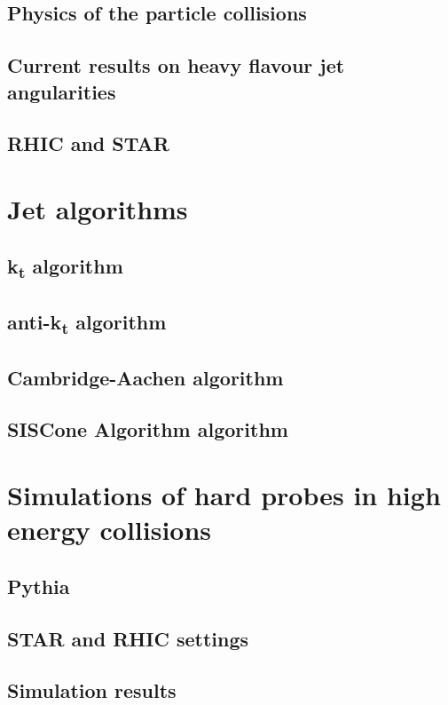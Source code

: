 \documentclass[a4paper,oneside,12pt]{book}
\begin{document}
    \section{Physics of the particle collisions}
    \section{Current results on heavy flavour jet angularities} %
    \section{RHIC and STAR}



    \chapter{Jet algorithms} %
    \section{k\textsubscript{t} algorithm}
    \section{anti-k\textsubscript{t} algorithm}
    \section{Cambridge-Aachen algorithm} %
    \section{SISCone Algorithm algorithm} %


    \chapter{Simulations of hard probes in high energy collisions}
    \section{Pythia}
    \section{STAR and RHIC settings}
    \section{Simulation results} %
\end{document}
